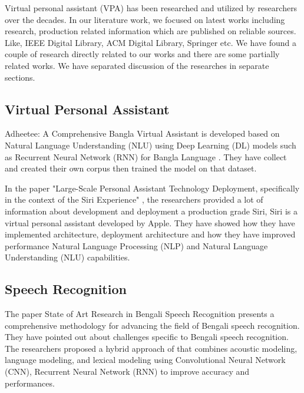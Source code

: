 Virtual personal assistant (VPA) has been researched and utilized by researchers over the decades.
In our literature work, we focused on latest works including research, production related information which are published on reliable sources.
Like, IEEE Digital Library, ACM Digital Library, Springer etc.
We have found a couple of research directly related to our works and there are some partially related works.
We have separated discussion of the researches in separate sections.

\subsection{Virtual Personal Assistant}\label{subsec:virtual-personal-assistant}
Adheetee: A Comprehensive Bangla Virtual Assistant is developed based on Natural Language Understanding (NLU) using Deep Learning (DL) models such as Recurrent Neural Network (RNN) for Bangla Language \cite{adheetee}.
They have collect and created their own corpus then trained the model on that dataset.

In the paper "Large-Scale Personal Assistant Technology Deployment, specifically in the context of the Siri Experience" \cite{siri-experience}, the researchers provided a lot of information about development and deployment a production grade Siri, Siri is a virtual personal assistant developed by Apple.
They have showed how they have implemented architecture, deployment architecture and how they have improved performance Natural Language Processing (NLP) and Natural Language Understanding (NLU) capabilities.

\subsection{Speech Recognition}\label{subsec:speech-recognition}
The paper State of Art Research in Bengali Speech Recognition \cite{speech-recog-bengali} presents a comprehensive methodology for advancing the field of Bengali speech recognition.
They have pointed out about challenges specific to Bengali speech recognition.
The researchers proposed a hybrid approach of that combines acoustic modeling, language modeling, and lexical modeling using Convolutional Neural Network (CNN), Recurrent Neural Network (RNN) to improve accuracy and performances.


